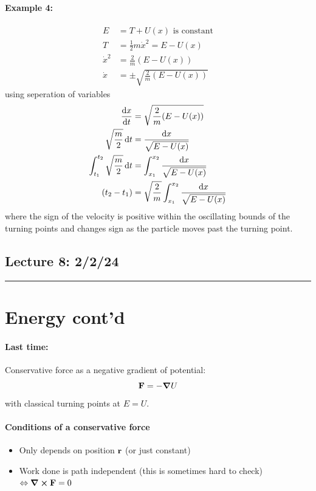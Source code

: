 \documentclass[../main.tex]{subfiles}
\begin{document}
\paragraph{Example 4:}
\begin{align*}
    E &= T + U(x) \textrm{ is constant} \\
    T &= \frac{1}{2} m \dot{x}^2  = E - U(x) \\
    \dot {x}^2 &= \frac{2}{m} (E - U(x)) \\
    \dot{x} &= \pm \sqrt{\frac{2}{m} (E - U(x))}
\end{align*} 
using seperation of variables
\begin{align*}
    \dv{x}{t} &= \sqrt{\frac{2}{m} (E - U(x))} \\
    \sqrt{\frac{m}{2}} \dd{t} &= \frac{\dd{x}}{\sqrt{E - U(x)}} \\
    \int_{t_1}^{t_2} \sqrt{\frac{m}{2}} \dd{t} &= \int_{x_1}^{x_2} \frac{\dd{x}}{\sqrt{E - U(x)}} \\
    (t_2 - t_1) &= \sqrt{\frac{2}{m}} \int_{x_1}^{x_2} \frac{\dd{x}}{\sqrt{E - U(x)}}
\end{align*}
where the sign of the velocity is positive within the oscillating bounds of the turning points and
changes sign as the particle moves past the turning point. 

\pagebreak
\subsection*{Lecture 8: \hfill  2/2/24}
\hrule \vspace{10px}
\section*{Energy cont'd}

\paragraph{Last time:} Conservative force as a negative gradient of potential:
\[
    \vb{F} = -\grad U
\]
with classical turning points at $E = U$.

\paragraph{Conditions of a conservative force}
\begin{itemize}
    \item Only depends on position $\vb{r}$ (or just constant)
    \item Work done is path independent (this is sometimes hard to check) $\Leftrightarrow
    \curl{\vb F} = 0$
\end{itemize}
\end{document}
